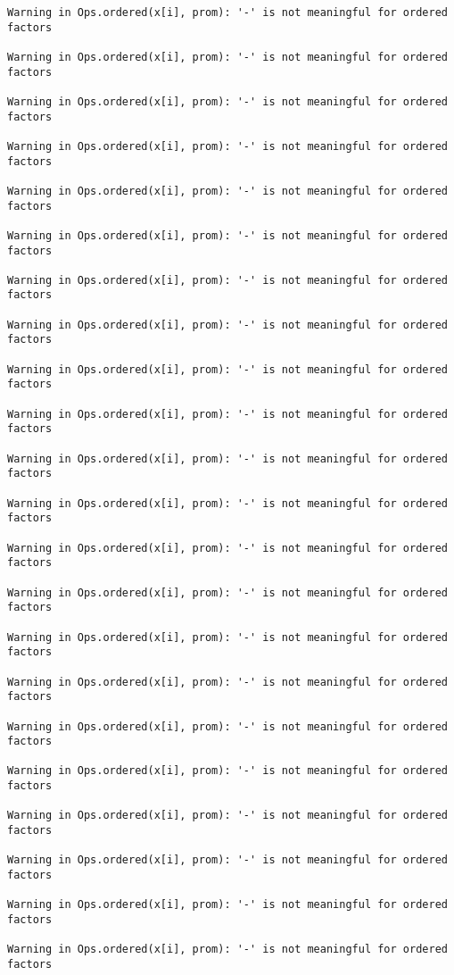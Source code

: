 \documentclass[]{article}
\begin{document}
\begin{verbatim}
Warning in Ops.ordered(x[i], prom): '-' is not meaningful for ordered
factors

Warning in Ops.ordered(x[i], prom): '-' is not meaningful for ordered
factors

Warning in Ops.ordered(x[i], prom): '-' is not meaningful for ordered
factors

Warning in Ops.ordered(x[i], prom): '-' is not meaningful for ordered
factors

Warning in Ops.ordered(x[i], prom): '-' is not meaningful for ordered
factors

Warning in Ops.ordered(x[i], prom): '-' is not meaningful for ordered
factors

Warning in Ops.ordered(x[i], prom): '-' is not meaningful for ordered
factors

Warning in Ops.ordered(x[i], prom): '-' is not meaningful for ordered
factors

Warning in Ops.ordered(x[i], prom): '-' is not meaningful for ordered
factors

Warning in Ops.ordered(x[i], prom): '-' is not meaningful for ordered
factors

Warning in Ops.ordered(x[i], prom): '-' is not meaningful for ordered
factors

Warning in Ops.ordered(x[i], prom): '-' is not meaningful for ordered
factors

Warning in Ops.ordered(x[i], prom): '-' is not meaningful for ordered
factors

Warning in Ops.ordered(x[i], prom): '-' is not meaningful for ordered
factors

Warning in Ops.ordered(x[i], prom): '-' is not meaningful for ordered
factors

Warning in Ops.ordered(x[i], prom): '-' is not meaningful for ordered
factors

Warning in Ops.ordered(x[i], prom): '-' is not meaningful for ordered
factors

Warning in Ops.ordered(x[i], prom): '-' is not meaningful for ordered
factors

Warning in Ops.ordered(x[i], prom): '-' is not meaningful for ordered
factors

Warning in Ops.ordered(x[i], prom): '-' is not meaningful for ordered
factors

Warning in Ops.ordered(x[i], prom): '-' is not meaningful for ordered
factors

Warning in Ops.ordered(x[i], prom): '-' is not meaningful for ordered
factors


\end{verbatim}
\end{document}

